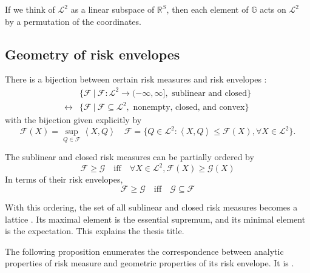 If we think of \(\mathscr{L}^2\) as a linear subspace of \(\mathbb{R}^S\), then each element of \(\mathbb{G}\) acts on $\mathscr{L}^2$ by a permutation of the coordinates.

\subsection{Geometry of risk envelopes}
There is a bijection between certain risk measures and risk envelopes \cite[Section C.3]{hiriart-urrutyFundamentalsConvexAnalysis2001}:
\begin{align}
&\{\mathcal{F}\: | \: \mathcal{F}: \mathscr{L}^2\to (-\infty, \infty], \text{ sublinear and closed}\} \\
\leftrightarrow &
\{\mathscr{F} \:|\: \mathscr{F}\subseteq \mathscr{L}^2,\text{ nonempty, closed, and convex}\}
\end{align}
with the bijection given explicitly by 
\begin{equation}
\mathcal{F}(X ) = \sup_{Q \in \mathscr{F}} \left<X, Q \right> \quad \mathscr{F} = \{Q \in \mathscr{L}^2 : \left<X, Q \right>\le \mathcal{F}(X), \forall X \in \mathscr{L}^2 \}.
\end{equation}

\begin{remark}
	The sublinear and closed risk measures can be partially ordered by
\begin{equation}
\mathcal{F} \ge \mathcal{G} 
\quad \text{iff}\quad
\forall X \in \mathscr{L}^2, \mathcal{F}(X) \ge \mathcal{G}(X) 
\end{equation}
In terms of their risk envelopes, 
\begin{equation}
\mathcal{F} \ge \mathcal{G} 
\quad \text{iff}\quad
\mathscr{G} \subseteq \mathscr{F}
\end{equation}

With this ordering, the set of all sublinear and closed risk measures becomes a lattice \cite[Section 5.4]{williamsonFairnessRiskMeasures2019}. Its maximal element is the essential supremum, and its minimal element is the expectation. This explains the thesis title.
\end{remark}

The following proposition enumerates the correspondence between analytic properties of risk measure and geometric properties of its risk envelope. It is \cite[Proposition 7]{williamsonFairnessRiskMeasures2019}.

